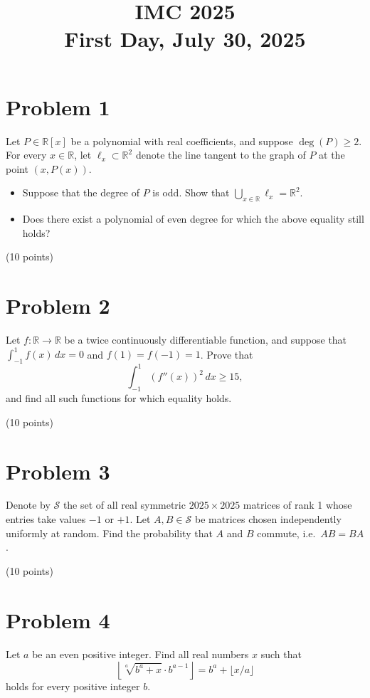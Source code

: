 \documentclass{article}
\title{IMC 2025 \\ First Day, July 30, 2025}
\date{}
\begin{document}
\maketitle

\section*{Problem 1}
Let $P \in \mathbb{R}[x]$ be a polynomial with real coefficients, and suppose $\deg(P) \geq 2$. For every $x \in \mathbb{R}$, let $\ell_x \subset \mathbb{R}^2$ denote the line tangent to the graph of $P$ at the point $(x, P(x))$.
\begin{itemize}
\item[(a)] Suppose that the degree of $P$ is odd. Show that $\bigcup_{x \in \mathbb{R}} \ell_x = \mathbb{R}^2$.
\item[(b)] Does there exist a polynomial of even degree for which the above equality still holds?
\end{itemize}
(10 points)

\section*{Problem 2}
Let $f : \mathbb{R} \to \mathbb{R}$ be a twice continuously differentiable function, and suppose that $\int_{-1}^{1} f(x)\,dx = 0$ and $f(1) = f(-1) = 1$. Prove that
\[
\int_{-1}^{1} (f''(x))^2 \, dx \geq 15,
\]
and find all such functions for which equality holds.

(10 points)

\section*{Problem 3}
Denote by $\mathcal{S}$ the set of all real symmetric $2025 \times 2025$ matrices of rank 1 whose entries take values $-1$ or $+1$. Let $A, B \in \mathcal{S}$ be matrices chosen independently uniformly at random. Find the probability that $A$ and $B$ commute, i.e.\ $AB = BA$.

(10 points)

\section*{Problem 4}
Let $a$ be an even positive integer. Find all real numbers $x$ such that
\begin{equation}
\left\lfloor \sqrt[a]{b^a + x} \cdot b^{a-1} \right\rfloor = b^a + \lfloor x/a \rfloor
\end{equation}
holds for every positive integer $b$.
\end{document}
